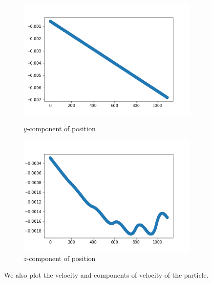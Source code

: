 \documentclass[12pt]{article}
\begin{document}
\begin{figure}[H]
	\begin{multicols}{2}
		\includegraphics[width=\linewidth, height=6cm]{psy1.png} \caption{$y$-component of position} \label{psy1} \par
		\includegraphics[width=\linewidth, height=6cm]{psz1.png} \caption{$z$-component of position} \label{psz1} \par
	\end{multicols}
\end{figure}

	We also plot the velocity and components of velocity of the particle.
\end{document}
